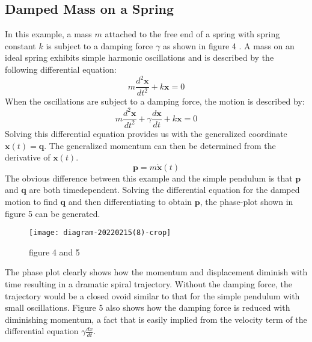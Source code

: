 \subsection{Damped Mass on a Spring}
In this example, a mass $m$ attached to the free end of a spring with spring constant $k$ is subject to a damping force $\gamma$ as shown in figure 4 . A mass on an ideal spring exhibits simple harmonic oscillations and is described by the following differential equation:
$$
m \frac{d^{2} \boldsymbol{x}}{d t^{2}}+k \boldsymbol{x}=0
$$
When the oscillations are subject to a damping force, the motion is described by:
$$
m \frac{d^{2} \boldsymbol{x}}{d t^{2}}+\gamma \frac{d \boldsymbol{x}}{d t}+k \boldsymbol{x}=0
$$
Solving this differential equation provides us with the generalized coordinate $\boldsymbol{x}(t)=\boldsymbol{q}$. The generalized momentum can then be determined from the derivative of $\boldsymbol{x}(t)$.\\
$$
\boldsymbol{p}=m \dot{\boldsymbol{x}}(t)
$$
The obvious difference between this example and the simple pendulum is that $\boldsymbol{p}$ and $\boldsymbol{q}$ are both timedependent.
Solving the differential equation for the damped motion to find $\boldsymbol{q}$ and then differentiating to obtain $\boldsymbol{p}$, the phase-plot shown in figure 5 can be generated.\\
\begin{figure}[H]
	\centering
	\texttt{[image: diagram-20220215(8)-crop]}
	\caption{figure 4 and 5}
	\label{}
\end{figure}
The phase plot clearly shows how the momentum and displacement diminish with time resulting in a dramatic spiral trajectory. Without the damping force, the trajectory would be a closed ovoid similar to that for the simple pendulum with small oscillations. Figure 5 also shows how the damping force is reduced with diminishing momentum, a fact that is easily implied from the velocity term of the differential equation $\gamma \frac{d x}{d t}$.


